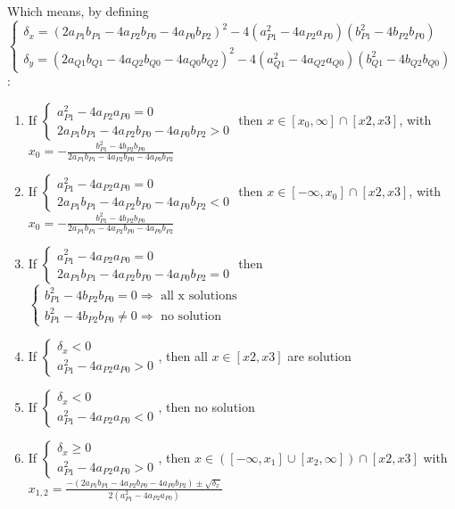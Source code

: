 \documentclass[paper=a4, fontsize=11pt]{scrartcl}
\numberwithin{equation}{section}		%
\numberwithin{figure}{section}			%
\numberwithin{table}{section}				%
\begin{document}
Which means, by defining $\left\{\begin{array}{l}\delta_x = \left( 2a_{P1}b_{P1} - 4a_{P2}b_{P0} - 4a_{P0}b_{P2} \right)^2-4\left( a_{P1}^2-4a_{P2}a_{P0} \right)\left(b_{P1}^2-4b_{P2}b_{P0}\right)\\
\delta_y = \left( 2a_{Q1}b_{Q1} - 4a_{Q2}b_{Q0} - 4a_{Q0}b_{Q2} \right)^2-4\left( a_{Q1}^2-4a_{Q2}a_{Q0} \right)\left(b_{Q1}^2-4b_{Q2}b_{Q0}\right)\end{array}\right.$:
\begin{enumerate}
\item If $\left\{\begin{array}{l}a_{P1}^2-4a_{P2}a_{P0}=0\\ 2a_{P1}b_{P1} - 4a_{P2}b_{P0} - 4a_{P0}b_{P2} > 0\end{array}\right.$ then $x \in [x_0,\infty]\cap[x2,x3]$, with $x_0=-\frac{b_{P1}^2-4b_{P2}b_{P0}}{2a_{P1}b_{P1} - 4a_{P2}b_{P0} - 4a_{P0}b_{P2}}$
\item If $\left\{\begin{array}{l}a_{P1}^2-4a_{P2}a_{P0}=0\\ 2a_{P1}b_{P1} - 4a_{P2}b_{P0} - 4a_{P0}b_{P2} < 0\end{array}\right.$ then $x \in [-\infty,x_0]\cap[x2,x3]$, with $x_0=-\frac{b_{P1}^2-4b_{P2}b_{P0}}{2a_{P1}b_{P1} - 4a_{P2}b_{P0} - 4a_{P0}b_{P2}}$
\item If $\left\{\begin{array}{l}a_{P1}^2-4a_{P2}a_{P0}=0\\ 2a_{P1}b_{P1} - 4a_{P2}b_{P0} - 4a_{P0}b_{P2} = 0\end{array}\right.$ then $\left\{\begin{array}{l}b_{P1}^2-4b_{P2}b_{P0}=0 \Rightarrow \text{ all x solutions}\\ b_{P1}^2-4b_{P2}b_{P0} \neq 0 \Rightarrow \text{ no solution}\end{array}\right.$
\item If $\left\{\begin{array}{l}\delta_x < 0\\a_{P1}^2-4a_{P2}a_{P0} > 0 \end{array}\right.$, then all $x \in [x2,x3]$ are solution
\item If $\left\{\begin{array}{l}\delta_x < 0\\a_{P1}^2-4a_{P2}a_{P0} < 0 \end{array}\right.$, then no solution
\item If $\left\{\begin{array}{l}\delta_x \geq 0\\a_{P1}^2-4a_{P2}a_{P0} > 0 \end{array}\right.$, then $x \in \left([-\infty,x_1] \cup [x_2,\infty]\right) \cap [x2,x3]$ with $x_{1,2}=\frac{-\left( 2a_{P1}b_{P1} - 4a_{P2}b_{P0} - 4a_{P0}b_{P2} \right) \pm \sqrt{\delta_x}}{2\left( a_{P1}^2-4a_{P2}a_{P0} \right)}$

\end{enumerate}
\end{document}

